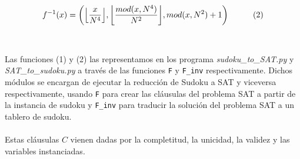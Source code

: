 \documentclass[letterpaper,12pt]{article}
\DeclarePairedDelimiter\floor{\lfloor}{\rfloor}
\begin{document}
\begin{equation*}
    f^{-1}(x) = \left(\floor*{\frac{x}{N^4}},  \floor*{\frac{mod(x,N^4)}{N^2}}, mod(x,N^2) + 1 \right) \hspace{1cm} \label{eq:2} (2)
\end{equation*}\\
\\
Las funciones (1) y (2) las representamos en los programa \textit{sudoku\_to\_SAT.py} y \textit{SAT\_to\_sudoku.py} a través de las funciones \texttt{F} y \texttt{F\_inv} respectivamente. Dichos módulos se encargan de ejecutar la reducción de Sudoku a SAT y viceversa respectivamente, usando \texttt{F} para crear las cl\'ausulas del problema SAT a partir de la instancia de sudoku y \texttt{F\_inv} para traducir la soluci\'on del problema SAT a un tablero de sudoku.\\
\\
Estas cláusulas $C$ vienen dadas por la completitud, la unicidad, la validez y las variables instanciadas.
\end{document}
